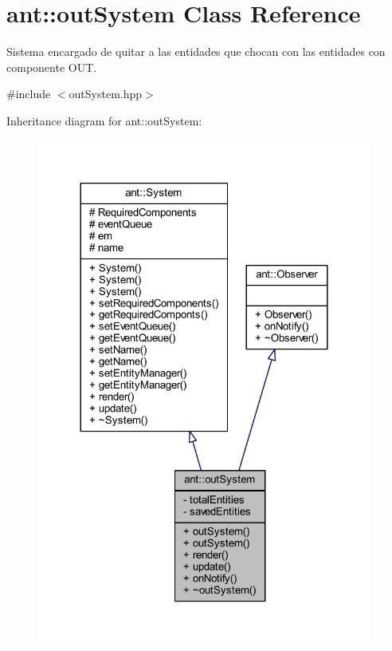 \hypertarget{classant_1_1out_system}{\section{ant\+:\+:out\+System Class Reference}
\label{classant_1_1out_system}
}


Sistema encargado de quitar a las entidades que chocan con las entidades con componente O\+U\+T.  




{\ttfamily \#include $<$out\+System.\+hpp$>$}



Inheritance diagram for ant\+:\+:out\+System\+:
\nopagebreak
\begin{figure}[H]
\begin{center}
\leavevmode
\includegraphics[width=312pt]{d2/dc1/classant_1_1out_system__inherit__graph}
\end{center}
\end{figure}


